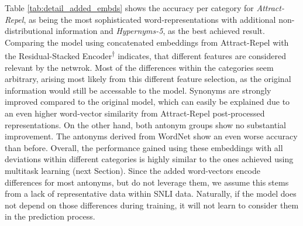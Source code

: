 Table \ref{tab:detail_added_embds} shows the accuracy per category for \textit{Attract-Repel}, as being the most sophisticated word-representations with additional non-distributional information and \textit{Hypernyms-5}, as the best achieved result. Comparing the model using concatenated embeddings from Attract-Repel with the Residual-Stacked Encoder\textsuperscript{$\dagger$} indicates, that different features are considered relevant by the netwrok. Most of the differences within the categories seem arbitrary, arising most likely from this different feature selection, as the original information would still be accessable to the model. Synonyms are strongly improved compared to the original model, which can easily be explained due to an even higher word-vector similarity from Attract-Repel post-processed representations. On the other hand, both antonym groups show no substantial improvement. The antonyms derived from WordNet show an even worse accuracy than before. Overall, the performance gained using these embeddings with all deviations within different categories is highly similar to the ones achieved using multitask learning (next Section). Since the added word-vectors encode differences for most antonyms, but do not leverage them, we assume this stems from a lack of representative data within \ac{SNLI} data. Naturally, if the model does not depend on those differences during training, it will not learn to consider them in the prediction process.

